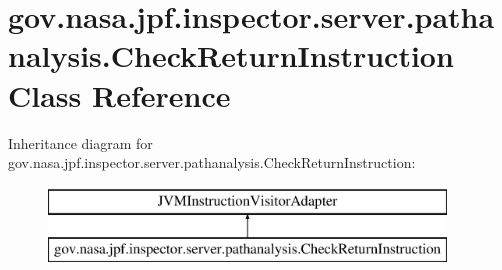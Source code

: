\hypertarget{classgov_1_1nasa_1_1jpf_1_1inspector_1_1server_1_1pathanalysis_1_1_check_return_instruction}{}\section{gov.\+nasa.\+jpf.\+inspector.\+server.\+pathanalysis.\+Check\+Return\+Instruction Class Reference}
\label{classgov_1_1nasa_1_1jpf_1_1inspector_1_1server_1_1pathanalysis_1_1_check_return_instruction}
Inheritance diagram for gov.\+nasa.\+jpf.\+inspector.\+server.\+pathanalysis.\+Check\+Return\+Instruction\+:\begin{figure}[H]
\begin{center}
\leavevmode
\includegraphics[height=2.000000cm]{classgov_1_1nasa_1_1jpf_1_1inspector_1_1server_1_1pathanalysis_1_1_check_return_instruction}
\end{center}
\end{figure}
